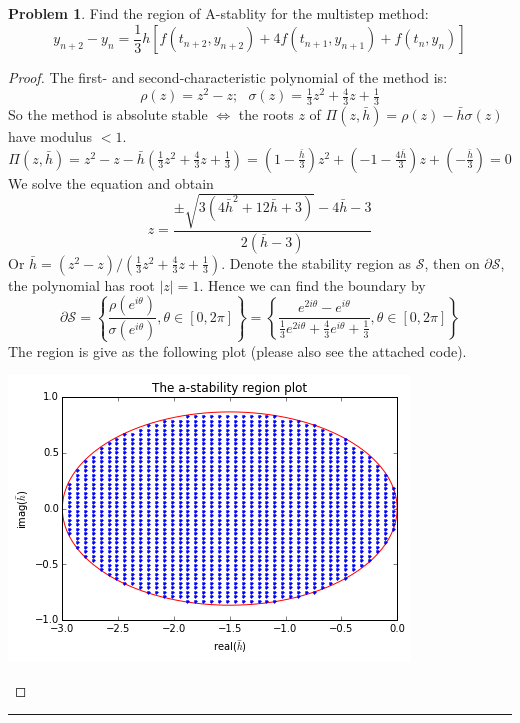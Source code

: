 \documentclass[a4paper, 10pt]{article}
\theoremstyle{definition}
\newtheorem{problem}{Problem}
\theoremstyle{hSol}
\begin{document}
\begin{problem} Find the region of A-stablity for the multistep method:
$$
y_{n+2} - y_n = \frac{1}{3}h [f(t_{n+2}, y_{n+2}) + 4f(t_{n+1}, y_{n+1}) + f(t_n, y_n) ]
$$
\end{problem}
\begin{proof} The first- and second-characteristic polynomial of the method is:
$$
\rho(z) = z^2 - z;~~~\sigma(z) = \tfrac{1}{3}z^2+\tfrac{4}{3}z+\tfrac{1}{3}
$$
So the method is absolute stable $\iff$ the roots $z$ of $\Pi(z,\bar{h})=\rho(z)-\bar{h}\sigma(z)$ have modulus $<1$.
\begin{equation}
  \Pi(z,\bar{h}) = z^2 - z - \bar{h}\left(\tfrac{1}{3}z^2+\tfrac{4}{3}z+\tfrac{1}{3}\right) = (1-\tfrac{\bar{h}}{3})z^2 + (-1-\tfrac{4\bar{h}}{3})z + (-\tfrac{\bar{h}}{3}) = 0
\end{equation}
We solve the equation and obtain
$$
z = \frac{\pm\sqrt{3(4 \bar{h}^2+12 \bar{h}+3)}-4 \bar{h}-3}{2 (\bar{h}-3)}
$$
Or $\bar{h} = (z^2 - z)/(\tfrac{1}{3}z^2+\tfrac{4}{3}z+\tfrac{1}{3})$. Denote the stability region as $\mathcal{S}$, then on $\partial \mathcal{S}$, the polynomial has root $|z|=1$. Hence we can find the boundary by
$$
\partial \mathcal{S} = \left\{\frac{\rho(e^{i\theta})}{\sigma(e^{i\theta})}, \theta\in [0, 2\pi]\right\} =  \left\{\frac{e^{2i\theta} - e^{i\theta}}{\tfrac{1}{3}e^{2i\theta}+\tfrac{4}{3}e^{i\theta}+\tfrac{1}{3}}, \theta\in [0, 2\pi]\right\}
$$
The region is give as the following plot (please also see the attached code).
\begin{center}
\includegraphics[scale=0.7]{hw2_p4.png}
\end{center}
\end{proof} 
\noindent\rule{16cm}{0.4pt}
\end{document}
